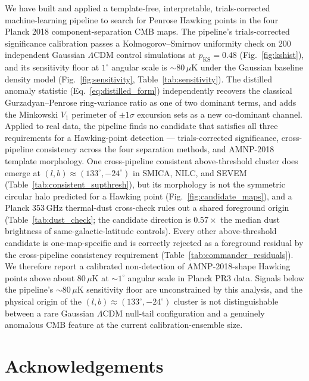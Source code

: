 \documentclass[fleqn,usenatbib]{mnras}
\begin{document}
We have built and applied a template-free, interpretable, trials-corrected machine-learning pipeline to search for Penrose Hawking points in the four Planck 2018 component-separation CMB maps. The pipeline's trials-corrected significance calibration passes a Kolmogorov--Smirnov uniformity check on 200 independent Gaussian $\Lambda$CDM control simulations at $p_{\text{KS}} = 0.48$ (Fig.~\ref{fig:kshist}), and its sensitivity floor at $1^\circ$ angular scale is $\sim 80\,\mu\mathrm{K}$ under the Gaussian baseline density model (Fig.~\ref{fig:sensitivity}, Table~\ref{tab:sensitivity}). The distilled anomaly statistic (Eq.~\ref{eq:distilled_form}) independently recovers the classical Gurzadyan--Penrose ring-variance ratio as one of two dominant terms, and adds the Minkowski $V_1$ perimeter of $\pm 1\sigma$ excursion sets as a new co-dominant channel. Applied to real data, the pipeline finds no candidate that satisfies all three requirements for a Hawking-point detection --- trials-corrected significance, cross-pipeline consistency across the four separation methods, and AMNP-2018 template morphology. One cross-pipeline consistent above-threshold cluster does emerge at $(l, b) \approx (133^\circ, -24^\circ)$ in SMICA, NILC, and SEVEM (Table~\ref{tab:consistent_supthresh}), but its morphology is not the symmetric circular halo predicted for a Hawking point (Fig.~\ref{fig:candidate_maps}), and a Planck 353\,GHz thermal-dust cross-check rules out a shared foreground origin (Table~\ref{tab:dust_check}; the candidate direction is $0.57 \times$ the median dust brightness of same-galactic-latitude controls). Every other above-threshold candidate is one-map-specific and is correctly rejected as a foreground residual by the cross-pipeline consistency requirement (Table~\ref{tab:commander_residuals}). We therefore report a calibrated non-detection of AMNP-2018-shape Hawking points above about $80\,\mu\mathrm{K}$ at $\sim 1^\circ$ angular scale in Planck PR3 data. Signals below the pipeline's $\sim 80\,\mu\mathrm{K}$ sensitivity floor are unconstrained by this analysis, and the physical origin of the $(l, b) \approx (133^\circ, -24^\circ)$ cluster is not distinguishable between a rare Gaussian $\Lambda$CDM null-tail configuration and a genuinely anomalous CMB feature at the current calibration-ensemble size.

\section*{Acknowledgements}
\end{document}
